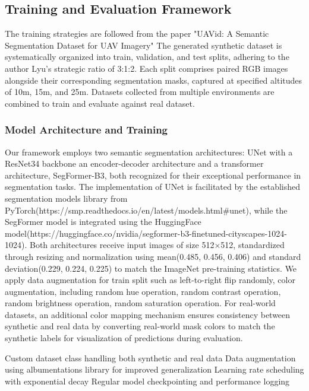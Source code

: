 \documentclass[../report.tex]{subfiles}
\begin{document}
    \subsection{Training and Evaluation Framework}
    The training strategies are followed from the paper "UAVid: A Semantic Segmentation Dataset for UAV Imagery" \cite{lyu2020uavid}
    The generated synthetic dataset is systematically organized into train, validation, and test splits, adhering to the author Lyu's strategic ratio of 3:1:2. Each split comprises paired RGB images alongside their corresponding segmentation masks, captured at specified altitudes of 10m, 15m, and 25m. Datasets collected from multiple environments are combined to train and evaluate against real dataset. 

    \subsubsection{Model Architecture and Training}
    Our framework employs two semantic segmentation architectures: UNet with a ResNet34 backbone an encoder-decoder architecture and a transformer architecture, SegFormer-B3, both recognized for their exceptional performance in segmentation tasks. The implementation of UNet is facilitated by the established segmentation models library from PyTorch(https://smp.readthedocs.io/en/latest/models.html#unet), while the SegFormer model is integrated using the HuggingFace model(https://huggingface.co/nvidia/segformer-b3-finetuned-cityscapes-1024-1024). 
    Both architectures receive input images of size 512×512, standardized through resizing and normalization using mean(0.485, 0.456, 0.406) and standard deviation(0.229, 0.224, 0.225) to match the ImageNet pre-training statistics. We apply data augmentation for train split such as left-to-right flip randomly, color augmentation, including random hue operation, random contrast operation, random brightness operation, random saturation operation.
    For real-world datasets, an additional color mapping mechanism ensures consistency between synthetic and real data by converting real-world mask colors to match the synthetic labels for visualization of predictions during evaluation.
    
    Custom dataset class handling both synthetic and real data 
    Data augmentation using albumentations library for improved generalization 
    Learning rate scheduling with exponential decay 
    Regular model checkpointing and performance logging 

    
\end{document}
